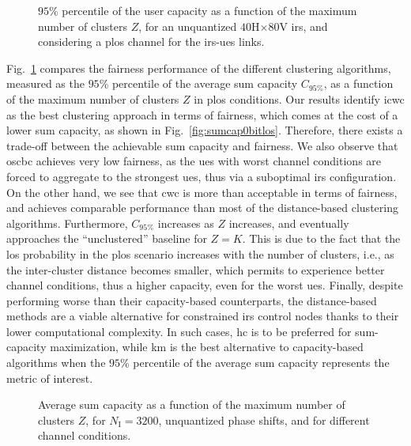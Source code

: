 \begin{figure}[t]
    \centering
    \setlength{}
    \setlength{}
    
    \caption{$95$\% percentile of the user capacity as a function of the maximum number of clusters $Z$, for an unquantized $40$H$\times80$V \gls{irs}, and considering a \gls{plos} channel for the \gls{irs}-\glspl{ue} links.}
    \label{fig:quantile0bitsplos}
\end{figure}


Fig.~\ref{fig:quantile0bitsplos} compares the fairness performance of the different clustering algorithms, measured as the $95$\% percentile of the average sum capacity $C_{95\%}$, as a function of the maximum number of clusters $Z$ in \gls{plos} conditions. 
Our results identify \gls{icwc} as the best clustering approach in terms of fairness, which comes at the cost of a lower sum capacity, as shown in Fig.~\ref{fig:sumcap0bitlos}. 
Therefore, there exists a trade-off between the achievable sum capacity and fairness. 
We also observe that \gls{oscbc} achieves very low fairness, as the \glspl{ue} with worst channel conditions are forced to aggregate to the strongest \glspl{ue}, thus via a suboptimal \gls{irs} configuration. On the other hand, we see that \gls{cwc} is more than acceptable in terms of fairness, and achieves comparable performance than most of the distance-based clustering algorithms.
Furthermore, $C_{95\%}$ increases as $Z$ increases, and eventually approaches the ``unclustered'' baseline for $Z=K$. This is due to the fact that the \gls{los} probability in the \gls{plos} scenario increases with the number of clusters, i.e., as the inter-cluster distance becomes smaller, which permits to experience better channel conditions, thus a higher capacity, even for the worst \glspl{ue}.
Finally, despite performing worse than their capacity-based counterparts, the distance-based methods are a viable alternative for constrained \gls{irs} control nodes thanks to their lower computational complexity. In such cases, \gls{hc} is to be preferred for sum-capacity maximization, while \gls{km} is the best alternative to capacity-based algorithms when the $95$\% percentile of the average sum capacity represents the metric of interest.

\begin{figure}[t]
    \centering
    \setlength{}
    \setlength{}
    
    \caption{Average sum capacity as a function of the maximum number of clusters $Z$, for $N_{\mathrm I}=3200$, unquantized phase shifts, and for different channel conditions.}
    \label{fig:sumcaplos}
\end{figure}

